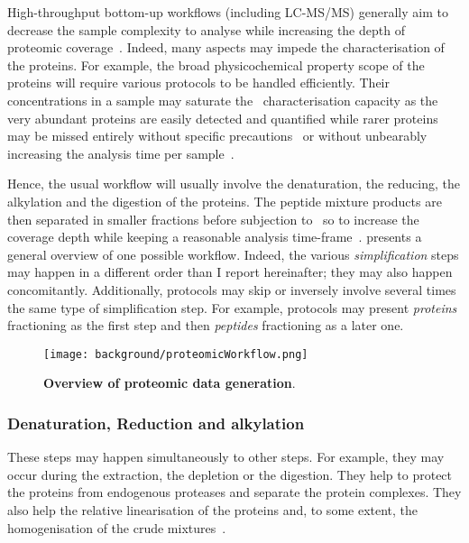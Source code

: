 High-throughput bottom-up workflows (including \gls{LC-MS/MS}) generally
aim to decrease the sample complexity to analyse while increasing the depth
of proteomic coverage~. Indeed,
many aspects may impede the characterisation of the proteins.
For example, the broad physicochemical property scope of the proteins will
require various protocols to be handled efficiently.
Their concentrations in a sample may saturate the \ms\ characterisation capacity
as the very abundant proteins are easily detected and quantified while rarer
proteins may be missed entirely without specific precautions~ or without unbearably increasing the
analysis time per sample~.

Hence, the usual workflow will usually involve the denaturation, the reducing,
the alkylation and the digestion of the proteins. The peptide mixture products
are then separated in smaller fractions before subjection to \ms\ so to increase
the coverage depth
while keeping a reasonable analysis time-frame~.
 presents a general overview of one possible workflow.
Indeed, the various \emph{simplification} steps may happen in a different order
than I report hereinafter; they may also happen concomitantly. Additionally,
protocols may skip or inversely involve several times the same type of
simplification step. For example, protocols may present
\emph{proteins} fractioning as the first step
and then \emph{peptides} fractioning as a later one.

\begin{figure}[!htpb]
    \texttt{[image: background/proteomicWorkflow.png]}\centering
    \caption[Overview of proteomic data generation]{\label{fig:proteomics}%
    \textbf{Overview of proteomic data generation}.}
\end{figure}

\subsubsection{Denaturation, Reduction and alkylation}

These steps may happen simultaneously to other steps. For example, they may
occur during the extraction, the depletion or the digestion. They help to protect
the proteins from endogenous proteases and separate the protein complexes. They
also help the relative linearisation of the proteins and, to some extent,
the homogenisation of the crude mixtures~.

